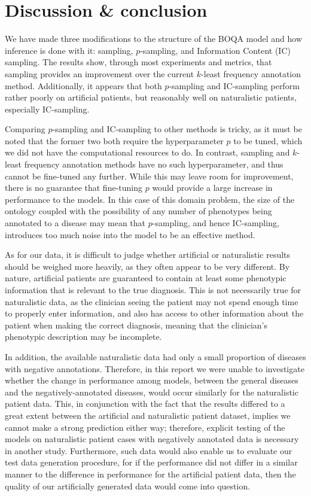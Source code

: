 \section{Discussion \& conclusion}
\label{sec:dis}
%
We have made three modifications to the structure of the BOQA model and how inference is done with it:
sampling, $p$-sampling, and Information Content (IC) sampling. The results show,
through most experiments and metrics, that sampling provides an improvement over
the current $k$-least frequency annotation method. Additionally, it
appears that both $p$-sampling and IC-sampling perform rather poorly on artificial
patients, but reasonably well on naturalistic patients, especially IC-sampling.

Comparing $p$-sampling and IC-sampling to other
methods is tricky, as it must be noted that the former two both require the hyperparameter $p$ to be tuned, which we did
not have the computational resources to do. In contrast, sampling and $k$-least 
frequency annotation methods have no such hyperparameter, and thus cannot be fine-tuned
any further. While this may leave room for improvement, 
there is no guarantee that fine-tuning $p$ would provide a large
increase in performance to the models. In this case of this domain problem, the size of the ontology coupled with 
the possibility of any number of phenotypes being annotated 
to a disease may mean that $p$-sampling, and hence IC-sampling, introduces too much noise into the model
to be an effective method.

As for our data,
it is difficult to judge whether artificial or naturalistic results should be weighed
more heavily, as they often appear to be very different. By nature, artificial patients
are guaranteed to contain at least some phenotypic information that is relevant to the 
true diagnosis. This is not necessarily true for naturalistic data, as the clinician seeing
the patient may not spend enough time to properly enter information, and also has access
to other information about the patient when making the correct diagnosis, meaning that the clinician's
phenotypic description may be incomplete.

In addition, the available naturalistic data had only a small proportion of diseases with negative annotations.
%
Therefore, in this report we were unable to investigate whether the change in performance among
models, between the general diseases and the negatively-annotated diseases, would occur similarly for
the naturalistic patient data.
%
This, in conjunction with the fact that the results differed to a great extent between the 
artificial and naturalistic patient dataset, implies we cannot make a strong prediction either way;
therefore, explicit testing of the models on  naturalistic patient cases with negatively annotated data
is necessary in another study.
%
Furthermore, such data would also enable us to evaluate our test data generation procedure, for if the 
performance did not differ in a similar manner to the difference in performance for the artificial patient
data, then the quality of our artificially generated data would come into question.

